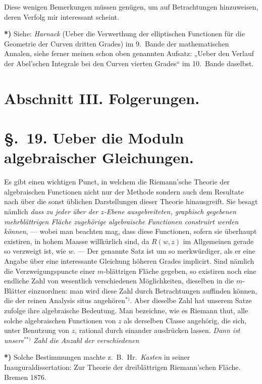 \documentclass{article}
\begin{document}
Diese wenigen Bemerkungen müssen genügen, um auf Betrachtungen hinzuweisen, deren Verfolg mir interessant scheint.

\textbf{*)} Siehe: \emph{Harnack} (Ueber die Verwerthung der elliptischen Functionen für die Geometrie der Curven dritten Grades) im 9.\ Bande der mathematischen Annalen, siehe ferner meinen schon oben genannten Aufsatz: „Ueber den Verlauf der Abel'schen Integrale bei den Curven vierten Grades“ im 10.\ Bande daselbst.


\section*{Abschnitt III. Folgerungen.}

\section*{§.~19. Ueber die Moduln algebraischer Gleichungen.}

Es gibt einen wichtigen Punct, in welchem die Riemann'sche Theorie der algebraischen Functionen nicht nur der Methode sondern auch dem Resultate nach über die sonst üblichen Darstellungen dieser Theorie hinausgreift. Sie besagt nämlich \emph{dass zu jeder über der $z$-Ebene ausgebreiteten, graphisch gegebenen mehrblättrigen Fläche zugehörige algebraische Functionen construirt werden können}, --- wobei man beachten mag, dass diese Functionen, sofern sie überhaupt existiren, in hohem Maasse willkürlich sind, da $R(w, z)$ im Allgemeinen gerade so verzweigt ist, wie $w$. --- Der genannte Satz ist um so merkwürdiger, als er eine Angabe über eine interessante Gleichung höheren Grades implicirt. Sind nämlich die Verzweigungspuncte einer $m$-blättrigen Fläche gegeben, so existiren noch eine endliche Zahl von wesentlich verschiedenen Möglichkeiten, dieselben in die $m$-Blätter einzuordnen: man wird diese Zahl durch Betrachtungen auffinden können, die der reinen Analysis situs angehören${}^{*)}$. Aber dieselbe Zahl hat unserem Satze zufolge ihre algebraische Bedeutung. Man bezeichne, wie es Riemann thut, alle solche algebraischen Functionen von $z$ als derselben Classe angehörig, die sich, unter Benutzung von $z$, rational durch einander ausdrücken lassen. \emph{Dann ist unsere}${}^{**)}$ \emph{Zahl die Anzahl der verschiedenen}

\textbf{*)} Solche Bestimmungen machte z.\ B.\ Hr.\ \emph{Kasten} in seiner Inauguraldissertation: Zur Theorie der dreiblättrigen Riemann'schen Fläche. Bremen 1876.
\end{document}
